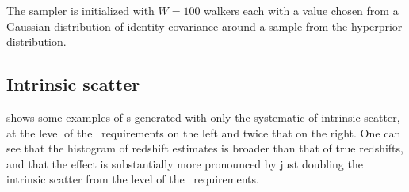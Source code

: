 %

The sampler is initialized with $W=100$ walkers each with a value chosen from a Gaussian distribution of identity covariance around a sample from the hyperprior distribution.  

\subsection{Intrinsic scatter}


 shows some examples of \pzpdf s generated with only the systematic of intrinsic scatter, at the level of the \lsst\ requirements on the left and twice that on the right.
One can see that the histogram of redshift estimates is broader than that of true redshifts, and that the effect is substantially more pronounced by just doubling the intrinsic scatter from the level of the \lsst\ requirements.

